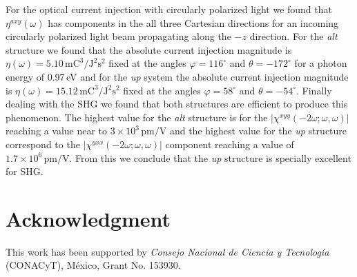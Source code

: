 \documentclass[pss]{wiley2sp} %
\begin{document}
For the optical current injection with circularly polarized light we found
that $\eta^{axy}(\omega)$ has components in the all three Cartesian directions
for an incoming circularly polarized light beam propagating along the $-z$
direction. For the \emph{alt} structure we found that the absolute current
injection magnitude is
$\eta(\omega)=5.10\,\mathrm{mC}^{3}/\mathrm{J}^{2}\mathrm{s}^{2}$ fixed at the
angles $\varphi=116^{\circ}$ and $\theta=-172^{\circ}$ for a photon energy of
0.97\,eV and for the \emph{up} system the absolute current injection magnitude
is $\eta(\omega)=15.12\,\mathrm{mC}^{3}/\mathrm{J}^{2}\mathrm{s}^{2}$ fixed at
the angles $\varphi=58^{\circ}$ and $\theta=-54^{\circ}$. Finally dealing with
the SHG we found that both structures are efficient to produce this phenomenon.
The highest value for the \emph{alt} structure is for the
$|\chi^{xyy}(-2\omega;\omega,\omega)|$ reaching a value near to
$3\times10^{3}\,\mathrm{pm/V}$ and the highest value for the \emph{up} structure
correspond to the $|\chi^{yxx}(-2\omega;\omega,\omega)|$ component reaching a
value of $1.7\times10^{6}\,\mathrm{pm/V}$. From this we conclude that
the \emph{up} structure is specially excellent for SHG.


\section{Acknowledgment} %

This work has been supported by \emph{Consejo Nacional de Ciencia y
Tecnolog\'ia} (CONACyT), M\'exico, Grant No. 153930.




\end{document}
